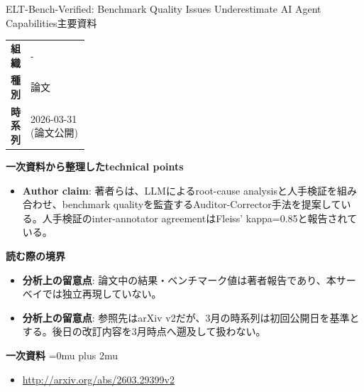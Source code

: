 \begin{technicalnote}{ELT-Bench-Verified: Benchmark Quality Issues Underestimate AI Agent Capabilities}{主要資料}
\begingroup
\begin{tabularx}{\linewidth}{@{}>{\bfseries}p{0.22\linewidth}X@{}}
組織 & - \\
種別 & 論文 \\
時系列 & 2026-03-31 (論文公開) \\
\end{tabularx}
\smallskip
{\bfseries 一次資料から整理したtechnical points}
\begin{itemize}[leftmargin=1.5em,itemsep=0.35em]
\item \textbf{Author claim}: 著者らは、LLMによるroot-cause analysisと人手検証を組み合わせ、benchmark qualityを監査するAuditor-Corrector手法を提案している。人手検証のinter-annotator agreementはFleiss' kappa=0.85と報告されている。
\end{itemize}
\begin{minipage}{\linewidth}
{\bfseries 読む際の境界}
\begin{itemize}[leftmargin=1.5em,itemsep=0.35em]
\item \textbf{分析上の留意点}: 論文中の結果・ベンチマーク値は著者報告であり、本サーベイでは独立再現していない。
\item \textbf{分析上の留意点}: 参照先はarXiv v2だが、3月の時系列は初回公開日を基準とする。後日の改訂内容を3月時点へ遡及して扱わない。
\end{itemize}
\begin{samepage}
{\bfseries 一次資料}
\begingroup\sloppy
\Urlmuskip=0mu plus 2mu\relax
\begin{itemize}[leftmargin=1.5em,itemsep=0.25em]
\item {\scriptsize\url{http://arxiv.org/abs/2603.29399v2}}
\end{itemize}
\endgroup
\end{samepage}
\end{minipage}
\endgroup
\end{technicalnote}
\medskip
